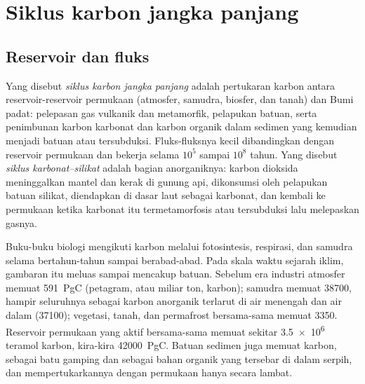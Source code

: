 \section{Siklus karbon jangka panjang}\label{sec:b2:deep-time-climate:cycle}

\subsection*{Reservoir dan fluks}

\begin{definition}\label{def:b2:deep-time-climate:carbon-cycle}
Yang disebut \emph{siklus karbon jangka panjang} adalah pertukaran karbon antara
reservoir-reservoir permukaan (atmosfer, samudra, biosfer, dan tanah) dan Bumi padat: pelepasan gas vulkanik dan
metamorfik, pelapukan batuan, serta penimbunan karbon karbonat dan karbon organik dalam
sedimen yang kemudian menjadi batuan atau tersubduksi. Fluks-fluksnya kecil dibandingkan dengan reservoir
permukaan dan bekerja selama $10^5$ sampai $10^8$ tahun. Yang disebut \emph{siklus
karbonat--silikat} adalah bagian anorganiknya: karbon dioksida meninggalkan mantel
dan kerak di gunung api, dikonsumsi oleh pelapukan batuan silikat, diendapkan di dasar
laut sebagai karbonat, dan kembali ke permukaan ketika karbonat itu termetamorfosis atau
tersubduksi lalu melepaskan gasnya.
\end{definition}

Buku-buku biologi mengikuti karbon melalui fotosintesis, respirasi, dan samudra selama bertahun-tahun sampai
berabad-abad. Pada skala waktu sejarah iklim, gambaran itu meluas sampai mencakup batuan. Sebelum
era industri atmosfer memuat \qty{591}{PgC} (petagram, atau miliar ton, karbon);
samudra memuat \num{38700}, hampir seluruhnya sebagai karbon anorganik terlarut di air menengah dan
air dalam (\num{37100}); vegetasi, tanah, dan permafrost bersama-sama memuat \num{3350}. Reservoir
permukaan yang aktif bersama-sama memuat sekitar \num{3.5e6} teramol karbon, kira-kira
\qty{42000}{PgC}. Batuan sedimen juga memuat karbon, sebagai batu gamping dan sebagai bahan organik yang
tersebar di dalam serpih, dan mempertukarkannya dengan permukaan hanya secara lambat.


